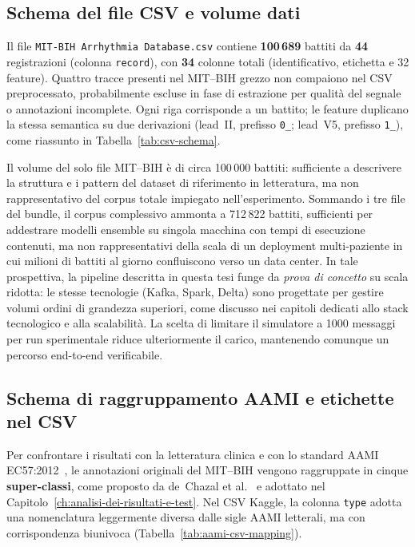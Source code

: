 \subsection{Schema del file CSV e volume dati}

Il file \texttt{MIT-BIH Arrhythmia Database.csv} contiene \textbf{100\,689} battiti da \textbf{44} registrazioni (colonna \texttt{record}), con \textbf{34} colonne totali (identificativo, etichetta e 32 feature).
Quattro tracce presenti nel MIT--BIH grezzo non compaiono nel CSV preprocessato, probabilmente escluse in fase di estrazione per qualità del segnale o annotazioni incomplete.
Ogni riga corrisponde a un battito; le feature duplicano la stessa semantica su due derivazioni (lead~II, prefisso \texttt{0\_}; lead~V5, prefisso \texttt{1\_}), come riassunto in Tabella~\ref{tab:csv-schema}.

Il volume del solo file MIT--BIH è di circa 100\,000 battiti: sufficiente a descrivere la struttura e i pattern del dataset di riferimento in letteratura, ma non rappresentativo del corpus totale impiegato nell'esperimento.
Sommando i tre file del bundle, il corpus complessivo ammonta a 712\,822 battiti, sufficienti per addestrare modelli ensemble su singola macchina con tempi di esecuzione contenuti, ma non rappresentativi della scala di un deployment multi-paziente in cui milioni di battiti al giorno confluiscono verso un data center.
In tale prospettiva, la pipeline descritta in questa tesi funge da \emph{prova di concetto} su scala ridotta: le stesse tecnologie (Kafka, Spark, Delta) sono progettate per gestire volumi ordini di grandezza superiori, come discusso nei capitoli dedicati allo stack tecnologico e alla scalabilità.
La scelta di limitare il simulatore a 1000 messaggi per run sperimentale riduce ulteriormente il carico, mantenendo comunque un percorso end-to-end verificabile.

\subsection{Schema di raggruppamento AAMI e etichette nel CSV}

Per confrontare i risultati con la letteratura clinica e con lo standard AAMI EC57:2012~\cite{aami2012ec57}, le annotazioni originali del MIT--BIH vengono raggruppate in cinque \textbf{super-classi}, come proposto da de~Chazal et al.~\cite{dechazal2004automatic} e adottato nel Capitolo~\ref{ch:analisi-dei-risultati-e-test}.
Nel CSV Kaggle, la colonna \texttt{type} adotta una nomenclatura leggermente diversa dalle sigle AAMI letterali, ma con corrispondenza biunivoca (Tabella~\ref{tab:aami-csv-mapping}).


